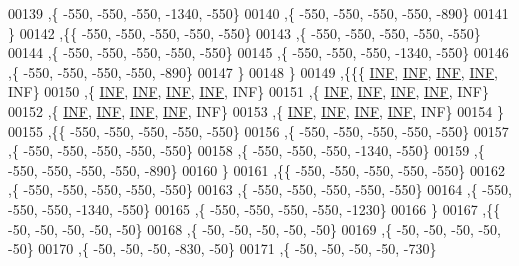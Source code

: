 \begin{DoxyCode}
00139   ,\{  -550,  -550,  -550, -1340,  -550\}
00140   ,\{  -550,  -550,  -550,  -550,  -890\}
00141   \}
00142  ,\{\{  -550,  -550,  -550,  -550,  -550\}
00143   ,\{  -550,  -550,  -550,  -550,  -550\}
00144   ,\{  -550,  -550,  -550,  -550,  -550\}
00145   ,\{  -550,  -550,  -550, -1340,  -550\}
00146   ,\{  -550,  -550,  -550,  -550,  -890\}
00147   \}
00148  \}
00149 ,\{\{\{   \hyperlink{energy__const_8h_a12c2040f25d8e3a7b9e1c2024c618cb6}{INF},   \hyperlink{energy__const_8h_a12c2040f25d8e3a7b9e1c2024c618cb6}{INF},   \hyperlink{energy__const_8h_a12c2040f25d8e3a7b9e1c2024c618cb6}{INF},   \hyperlink{energy__const_8h_a12c2040f25d8e3a7b9e1c2024c618cb6}{INF},   INF\}
00150   ,\{   \hyperlink{energy__const_8h_a12c2040f25d8e3a7b9e1c2024c618cb6}{INF},   \hyperlink{energy__const_8h_a12c2040f25d8e3a7b9e1c2024c618cb6}{INF},   \hyperlink{energy__const_8h_a12c2040f25d8e3a7b9e1c2024c618cb6}{INF},   \hyperlink{energy__const_8h_a12c2040f25d8e3a7b9e1c2024c618cb6}{INF},   INF\}
00151   ,\{   \hyperlink{energy__const_8h_a12c2040f25d8e3a7b9e1c2024c618cb6}{INF},   \hyperlink{energy__const_8h_a12c2040f25d8e3a7b9e1c2024c618cb6}{INF},   \hyperlink{energy__const_8h_a12c2040f25d8e3a7b9e1c2024c618cb6}{INF},   \hyperlink{energy__const_8h_a12c2040f25d8e3a7b9e1c2024c618cb6}{INF},   INF\}
00152   ,\{   \hyperlink{energy__const_8h_a12c2040f25d8e3a7b9e1c2024c618cb6}{INF},   \hyperlink{energy__const_8h_a12c2040f25d8e3a7b9e1c2024c618cb6}{INF},   \hyperlink{energy__const_8h_a12c2040f25d8e3a7b9e1c2024c618cb6}{INF},   \hyperlink{energy__const_8h_a12c2040f25d8e3a7b9e1c2024c618cb6}{INF},   INF\}
00153   ,\{   \hyperlink{energy__const_8h_a12c2040f25d8e3a7b9e1c2024c618cb6}{INF},   \hyperlink{energy__const_8h_a12c2040f25d8e3a7b9e1c2024c618cb6}{INF},   \hyperlink{energy__const_8h_a12c2040f25d8e3a7b9e1c2024c618cb6}{INF},   \hyperlink{energy__const_8h_a12c2040f25d8e3a7b9e1c2024c618cb6}{INF},   INF\}
00154   \}
00155  ,\{\{  -550,  -550,  -550,  -550,  -550\}
00156   ,\{  -550,  -550,  -550,  -550,  -550\}
00157   ,\{  -550,  -550,  -550,  -550,  -550\}
00158   ,\{  -550,  -550,  -550, -1340,  -550\}
00159   ,\{  -550,  -550,  -550,  -550,  -890\}
00160   \}
00161  ,\{\{  -550,  -550,  -550,  -550,  -550\}
00162   ,\{  -550,  -550,  -550,  -550,  -550\}
00163   ,\{  -550,  -550,  -550,  -550,  -550\}
00164   ,\{  -550,  -550,  -550, -1340,  -550\}
00165   ,\{  -550,  -550,  -550,  -550, -1230\}
00166   \}
00167  ,\{\{   -50,   -50,   -50,   -50,   -50\}
00168   ,\{   -50,   -50,   -50,   -50,   -50\}
00169   ,\{   -50,   -50,   -50,   -50,   -50\}
00170   ,\{   -50,   -50,   -50,  -830,   -50\}
00171   ,\{   -50,   -50,   -50,   -50,  -730\}

\end{DoxyCode}
